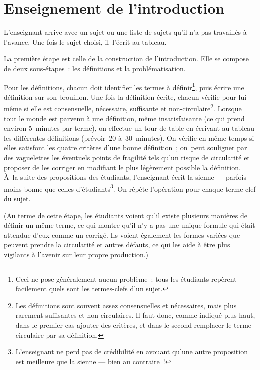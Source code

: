 \documentclass[a4paper,12pt]{report}
\begin{document}
\chapter{Enseignement de l'introduction}
\label{sec:orgab4e238}

L'enseignant arrive avec un sujet ou une liste de sujets qu'il n'a pas
travaillés à l'avance. Une fois le sujet choisi, il l'écrit au tableau.

La première étape est celle de la construction de l'introduction. Elle
se compose de deux sous-étapes : les définitions et la problématisation.

Pour les définitions, chacun doit identifier les termes à
définir\footnote{Ceci ne pose généralement aucun problème : tous les étudiants
repèrent facilement quels sont les termes-clefs d'un sujet.}, puis écrire une définition sur son brouillon. Une fois
la définition écrite, chacun vérifie pour lui-même si elle est
consensuelle, nécessaire, suffisante et non-circulaire\footnote{Les définitions sont souvent assez consensuelles et nécessaires,
mais plus rarement suffisantes et non-circulaires. Il faut donc, comme
indiqué plus haut, dans le premier cas ajouter des critères, et dans le
second remplacer le terme circulaire par sa définition.}. Lorsque
tout le monde est parvenu à une définition, même insatisfaisante (ce qui
prend environ 5 minutes par terme), on effectue un tour de table en
écrivant au tableau les différentes définitions (prévoir 20
à 30 minutes). On vérifie en même temps si elles satisfont les quatre
critères d'une bonne définition ; on peut souligner par des vaguelettes
les éventuels points de fragilité tels qu'un risque de circularité et
proposer de les corriger en modifiant le plus légèrement possible la
définition. À la suite des propositions des étudiants, l'enseignant
écrit la sienne — parfois moins bonne que celles d'étudiants\footnote{L'enseignant ne perd pas de crédibilité en avouant qu'une autre
proposition est meilleure que la sienne --- bien au contraire !}. On
répète l'opération pour chaque terme-clef du sujet.

(Au terme de cette étape, les étudiants voient qu'il existe plusieurs
manières de définir un même terme, ce qui montre qu'il n'y a pas une
unique formule qui était attendue d'eux comme un corrigé. Ils voient
également les formes variées que peuvent prendre la circularité et
autres défauts, ce qui les aide à être plus vigilants à l'avenir sur
leur propre production.)
\end{document}
